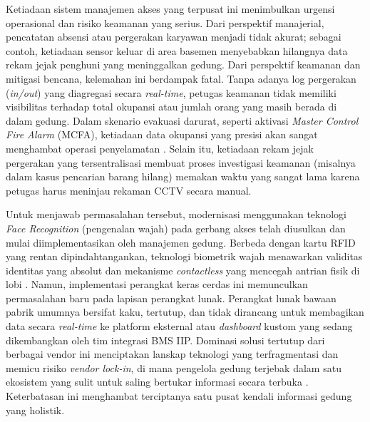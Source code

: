 Ketiadaan sistem manajemen akses yang terpusat ini menimbulkan urgensi operasional dan risiko keamanan yang serius. Dari perspektif manajerial, pencatatan absensi atau pergerakan karyawan menjadi tidak akurat; sebagai contoh, ketiadaan sensor keluar di area basemen menyebabkan hilangnya data rekam jejak penghuni yang meninggalkan gedung. Dari perspektif keamanan dan mitigasi bencana, kelemahan ini berdampak fatal. Tanpa adanya log pergerakan (\textit{in/out}) yang diagregasi secara \textit{real-time}, petugas keamanan tidak memiliki visibilitas terhadap total okupansi atau jumlah orang yang masih berada di dalam gedung. Dalam skenario evakuasi darurat, seperti aktivasi \textit{Master Control Fire Alarm} (MCFA), ketiadaan data okupansi yang presisi akan sangat menghambat operasi penyelamatan \autocite{SAINI2022106}. Selain itu, ketiadaan rekam jejak pergerakan yang tersentralisasi membuat proses investigasi keamanan (misalnya dalam kasus pencarian barang hilang) memakan waktu yang sangat lama karena petugas harus meninjau rekaman CCTV secara manual.

Untuk menjawab permasalahan tersebut, modernisasi menggunakan teknologi \textit{Face Recognition} (pengenalan wajah) pada gerbang akses telah diusulkan dan mulai diimplementasikan oleh manajemen gedung. Berbeda dengan kartu RFID yang rentan dipindahtangankan, teknologi biometrik wajah menawarkan validitas identitas yang absolut dan mekanisme \textit{contactless} yang mencegah antrian fisik di lobi \autocite{wanjare2024}. Namun, implementasi perangkat keras cerdas ini memunculkan permasalahan baru pada lapisan perangkat lunak. Perangkat lunak bawaan pabrik umumnya bersifat kaku, tertutup, dan tidak dirancang untuk membagikan data secara \textit{real-time} ke platform eksternal atau \textit{dashboard} kustom yang sedang dikembangkan oleh tim integrasi BMS IIP. Dominasi solusi tertutup dari berbagai vendor ini menciptakan lanskap teknologi yang terfragmentasi dan memicu risiko \textit{vendor lock-in}, di mana pengelola gedung terjebak dalam satu ekosistem yang sulit untuk saling bertukar informasi secara terbuka \autocite{s19020229}. Keterbatasan ini menghambat terciptanya satu pusat kendali informasi gedung yang holistik.

